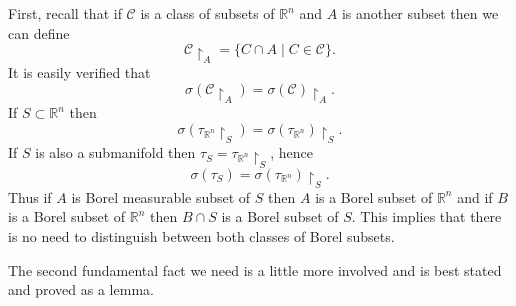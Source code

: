 \documentclass[%
 aip,
 amsmath,amssymb,
 reprint,%
jmp]{revtex4-2}
\begin{document}
First, recall that if $\mathcal{C}$ is a class of subsets of $\mathbb{R}^{n}$ and $A$ is another subset then we can define
\begin{equation*}
    \mathcal{C}\restriction_{A} = \{C\cap A\;|\;C\in\mathcal{C}\}.
\end{equation*}
It is easily verified that
\begin{equation*}
    \sigma(\mathcal{C}\restriction_{A}) = \sigma(\mathcal{C})\restriction_{A}.
\end{equation*}
If $S\subset\mathbb{R}^{n}$ then
\begin{equation*}
    \sigma(\tau_{\mathbb{R}^{n}}\restriction_{S}) = \sigma(\tau_{\mathbb{R}^{n}})\restriction_{S}.
\end{equation*}
If $S$ is also a submanifold then $\tau_{S} = \tau_{\mathbb{R}^{n}}\restriction_{S}$, hence
\begin{equation*}
    \sigma(\tau_{S}) = \sigma(\tau_{\mathbb{R}^{n}})\restriction_{S}.
\end{equation*}
Thus if $A$ is Borel measurable subset of $S$ then $A$ is a Borel subset of $\mathbb{R}^{n}$ and if $B$ is a Borel subset of $\mathbb{R}^{n}$ then $B\cap S$ is a Borel subset of $S$. This implies that there is no need to distinguish between both classes of Borel subsets.

The second fundamental fact we need is a little more involved and is best stated and proved as a lemma.
\end{document}
